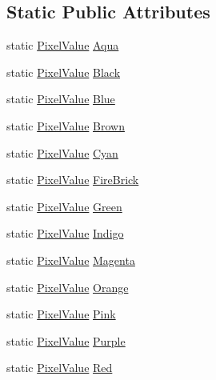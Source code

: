 \subsection*{Static Public Attributes}
\begin{DoxyCompactItemize}
\item 
static \hyperlink{class_k_k_b_1_1_pixel_value}{Pixel\+Value} \hyperlink{class_k_k_b_1_1_pixel_value_a51fc16a4bf4f2c1470b793db00e51db9}{Aqua}
\item 
static \hyperlink{class_k_k_b_1_1_pixel_value}{Pixel\+Value} \hyperlink{class_k_k_b_1_1_pixel_value_af2eb1c2546e02ff0f6c14ab76e604e19}{Black}
\item 
static \hyperlink{class_k_k_b_1_1_pixel_value}{Pixel\+Value} \hyperlink{class_k_k_b_1_1_pixel_value_a95467b558e03495bcedbbcb3b000cfd2}{Blue}
\item 
static \hyperlink{class_k_k_b_1_1_pixel_value}{Pixel\+Value} \hyperlink{class_k_k_b_1_1_pixel_value_aa9a5b8bef81ff8c7c88d6d5af5fd7761}{Brown}
\item 
static \hyperlink{class_k_k_b_1_1_pixel_value}{Pixel\+Value} \hyperlink{class_k_k_b_1_1_pixel_value_ac5a75718582075ab569462dddf7b8deb}{Cyan}
\item 
static \hyperlink{class_k_k_b_1_1_pixel_value}{Pixel\+Value} \hyperlink{class_k_k_b_1_1_pixel_value_a81ee11998b9a53025dffa8ef409cc0ee}{Fire\+Brick}
\item 
static \hyperlink{class_k_k_b_1_1_pixel_value}{Pixel\+Value} \hyperlink{class_k_k_b_1_1_pixel_value_a151caa1579d95170de6eccdd0947bf58}{Green}
\item 
static \hyperlink{class_k_k_b_1_1_pixel_value}{Pixel\+Value} \hyperlink{class_k_k_b_1_1_pixel_value_a4019d9eba808e36449e32bdfdf1a4c38}{Indigo}
\item 
static \hyperlink{class_k_k_b_1_1_pixel_value}{Pixel\+Value} \hyperlink{class_k_k_b_1_1_pixel_value_a39b5f23dae5d2065b943e5faa546879c}{Magenta}
\item 
static \hyperlink{class_k_k_b_1_1_pixel_value}{Pixel\+Value} \hyperlink{class_k_k_b_1_1_pixel_value_adfa545c41c42b0a959e9e118a88a850b}{Orange}
\item 
static \hyperlink{class_k_k_b_1_1_pixel_value}{Pixel\+Value} \hyperlink{class_k_k_b_1_1_pixel_value_a1eff1072e211955fffb26b91bb7d80e4}{Pink}
\item 
static \hyperlink{class_k_k_b_1_1_pixel_value}{Pixel\+Value} \hyperlink{class_k_k_b_1_1_pixel_value_ad957c67e590c8abf653217642afebbac}{Purple}
\item 
static \hyperlink{class_k_k_b_1_1_pixel_value}{Pixel\+Value} \hyperlink{class_k_k_b_1_1_pixel_value_a9d2c067be56aec7c69d00ec701020fca}{Red}

\end{DoxyCompactItemize}

